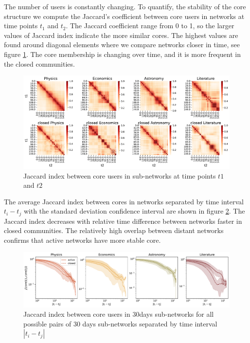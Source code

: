 The number of users is constantly changing. To quantify, the stability of the core structure we compute the Jaccard's coefficient between core users in networks at time points $t_1$ and $t_2$. The Jaccard coefficient range from 0 to 1, so the larger values of Jaccard index indicate the more similar cores. 
The highest values are found around diagonal elements where we compare networks closer in time, see figure \ref{fig:jaccard_hm}. The core membership is changing over time, and it is more frequent in the closed communities. 

\begin{figure}[h!]
	\centering
	\includegraphics[width=\linewidth]{figures/stackexchange/jaccard_heatmap.pdf}
	\caption{Jaccard index between core users in  sub-networks at time points $t1$ and $t2$}
	\label{fig:jaccard_hm}
\end{figure}  

The average Jaccard index between cores in networks separated by time interval $t_i-t_j$ with the standard deviation confidence interval are shown in figure \ref{fig:jaccard_mean}. The Jaccard index decreases with relative time difference between networks faster in closed communities. The relatively high overlap between distant networks confirms that active networks have more stable core. 

\begin{figure}[h!]
	\centering
	\includegraphics[width=\linewidth]{figures/stackexchange/jaccard.pdf}
	\caption{Jaccard index between core users in 30days sub-networks for all possible pairs of 30 days sub-networks separated by time interval $|t_i - t_j|$}
	\label{fig:jaccard_mean}
\end{figure}

